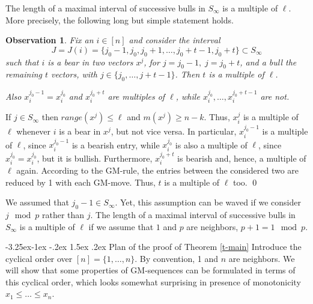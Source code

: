 \documentclass[10pt]{article}
\makeatletter
\renewcommand\subsection{\@startsection{subsection}{2}{\z@}
{-3.25ex\@plus -1ex \@minus -.2ex}
{1.5ex \@plus .2ex}
{\normalfont\normalsize\bfseries\boldmath}}
\newtheorem{observation}{Observation}
\theoremstyle{definition}
\makeatother
\begin{document}
\medskip 

The length of a maximal interval of successive bulls in $S_\infty$ 
is a multiple of $\ell$. 
More precisely, the following long but simple statement holds. 

\begin{observation}
\label{04} 
Fix an $i \in [n]$ and consider the interval     
$$J = J(i) = \{j_0-1, j_0, j_0+1, \ldots, j_0+t-1, j_0+t\} \subset S_\infty$$
such that $i$ is a bear in two vectors $x^j$,   
for $j = j_0-1, \; j=j_0+t$,  
and a bull the remaining $t$ vectors, with 
$j \in \{j_0, \ldots, j+t-1\}$. 
Then  $t$  is a multiple of $\ell$. 

Also  $x_i^{j_0-1} = x_i^{j_0}$  and 
$x_i^{j_0+t}$ are multiples of $\ell$, 
while $x_i^{j_0}, \ldots, x_i^{j_0+t-1}$ are not.  
\end{observation}

\proof 
If  $j \in S_\infty$  then 
$range(x^j) \leq \ell$  and  $m(x^j) \geq n-k$. 
Thus, $x_i^j$ is a multiple of $\ell$ 
whenever $i$ is a bear in $x^j$, 
but not vice versa. 
In particular, $x_i^{j_0-1}$ 
is a multiple of $\ell$, since $x_i^{j_0-1}$ 
is a bearish entry,  while 
$x_i^{j_0}$  is also a multiple of $\ell$, 
since  $x_i^{j_0} = x_i^{j_0}$, but it is bullish.  
Furthermore, $x_i^{j_0+t}$ is bearish and,   
hence, a multiple of $\ell$ again.  
According to the GM-rule, 
the entries between the considered two 
are reduced by 1 with each GM-move. 
Thus, $t$ is a multiple of $\ell$ too. 
\qed

\medskip 

We assumed that $j_0-1 \in S_\infty$. 
Yet, this assumption can be waved 
if we consider  $j \mod p$  rather than $j$.  
The length of a maximal interval 
of successive bulls in $S_\infty$ 
is a multiple of $\ell$  
if we assume that  $1$ and $p$ are neighbors, 
$p+1 = 1 \mod p$. 


\subsection{Plan of the proof of Theorem \ref{t-main}} 
Introduce the cyclical order over $[n] = \{1, \ldots, n\}$. 
By convention, 1 and $n$ are neighbors.  
We will show that some properties of GM-sequences can be 
formulated in terms of this cyclical order, 
which looks somewhat surprising in presence of monotonicity 
$x_1 \leq \ldots \leq x_n$.  
\end{document}
